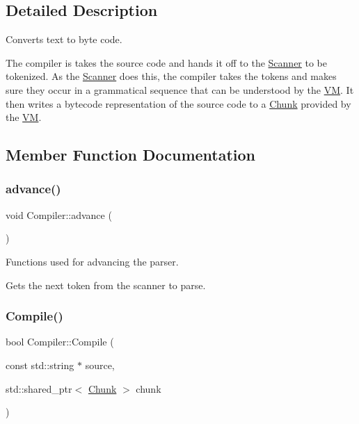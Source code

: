 \subsection{Detailed Description}
Converts text to byte code. 

The compiler is takes the source code and hands it off to the \hyperlink{class_scanner}{Scanner} to be tokenized. As the \hyperlink{class_scanner}{Scanner} does this, the compiler takes the tokens and makes sure they occur in a grammatical sequence that can be understood by the \hyperlink{class_v_m}{VM}. It then writes a bytecode representation of the source code to a \hyperlink{class_chunk}{Chunk} provided by the \hyperlink{class_v_m}{VM}. 

\subsection{Member Function Documentation}
\mbox{\label{class_compiler_a390358e6eaafd9e3c916307da6f8e46d}} 
\subsubsection{\texorpdfstring{advance()}{advance()}}
{\footnotesize\ttfamily void Compiler\+::advance (\begin{DoxyParamCaption}{ }\end{DoxyParamCaption})\hspace{0.3cm}{\ttfamily [private]}}



Functions used for advancing the parser. 

Gets the next token from the scanner to parse. \mbox{\label{class_compiler_acab82bf3a56c9891021aa1341ac639d3}} 
\subsubsection{\texorpdfstring{Compile()}{Compile()}}
{\footnotesize\ttfamily bool Compiler\+::\+Compile (\begin{DoxyParamCaption}\item[{const std\+::string $\ast$}]{source,  }\item[{std\+::shared\+\_\+ptr$<$ \hyperlink{class_chunk}{Chunk} $>$}]{chunk }\end{DoxyParamCaption})}



